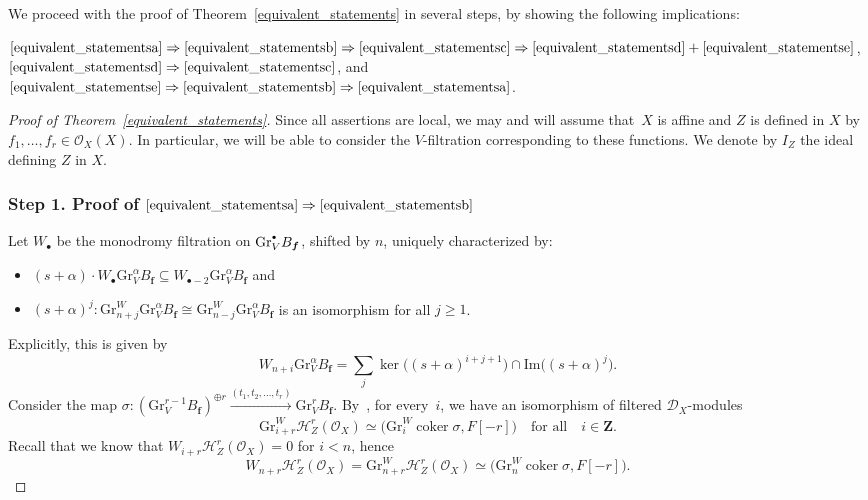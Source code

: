 \documentclass[11pt]{article}
\numberwithin{equation}{section}
\newcommand{\sbullet}{{\scriptscriptstyle\bullet}}
\newcommand{\csbullet}{{\raisebox{1pt}{$\sbullet$}}}
\newcommand{\DXmodules}{$\cD_X$\nobreakdash-mod\-ules\xspace}
\theoremstyle{plain}
\theoremstyle{definition}
\newcommand\Z{{\mathbf Z}}
\newcommand\cD{\mathcal{D}}
\newcommand\cH{\mathcal{H}}
\newcommand\cO{\mathcal{O}}
\newcommand\cH{\mathcal{H}}
\newcommand\cO{\mathcal{O}}
\newcommand\bff{{\boldsymbol f}}
\newcommand\gr{\mathrm{Gr}}
\DeclareMathOperator{\coker}{coker}
\begin{document}
We proceed with the proof of Theorem~\ref{equivalent_statements} in several steps, by showing the following implications:

$\eqref{equivalent_statementsa}\Rightarrow \eqref{equivalent_statementsb} \Rightarrow \eqref{equivalent_statementsc}\Rightarrow \eqref{equivalent_statementsd}+\eqref{equivalent_statementse}$, $\eqref{equivalent_statementsd}\Rightarrow\eqref{equivalent_statementsc}$, and $\eqref{equivalent_statementse}\Rightarrow \eqref{equivalent_statementsb} \Rightarrow \eqref{equivalent_statementsa}$.

\begin{proof}[Proof of Theorem~\ref{equivalent_statements}]
Since all assertions are local, we may and will assume that~$X$ is affine and $Z$ is defined in $X$ by $f_1,\ldots,f_r\in\cO_X(X)$.
In particular, we will be able to consider the $V$-filtration corresponding to these functions. We denote by $I_Z$
the ideal defining $Z$ in $X$.

\subsubsection*{Step 1. Proof of $\eqref{equivalent_statementsa}\Rightarrow\eqref{equivalent_statementsb}$}
Let $W_\sbullet$ be the monodromy filtration on $\gr^\csbullet_V B_\bff$, shifted by $n$, uniquely characterized by:
\begin{itemize}
\item $(s+\alpha)\cdot W_\sbullet\gr_V^{\alpha}B_{\bff} \subseteq W_{\sbullet-2}\gr_V^{\alpha}B_{\bff}$ and
\item $(s+\alpha)^j\colon \gr^W_{n+j}\gr_V^{\alpha}B_{\bff} \cong \gr^W_{n-j}\gr_V^{\alpha}B_{\bff}$ is an isomorphism
for all $j\geq 1$.
\end{itemize}
Explicitly, this is given by
\begin{equation}\label{monodromy}
W_{n+i}\gr_V^{\alpha}B_{\bff}=\sum_j\ker\big((s+\alpha)^{i+j+1}\big)\cap \mathrm{Im}\big((s+\alpha)^{j}\big).
\end{equation}
Consider the map $\sigma\colon \left(\gr^{r-1}_V B_\bff\right)^{\oplus r} \xrightarrow{(t_1,t_2,\dots,t_r)} \gr^{r}_V B_\bff$.
By~\cite[Th.\,1.2]{CD}, for every~$i$, we have an isomorphism of filtered \DXmodules
\begin{equation}\label{eq:sigma}
\gr^W_{i+r}\cH^r_Z(\cO_X)\simeq \big(\gr^W_i\coker \sigma, F[-r]\big)\quad\text{for all}\quad i\in\Z.
\end{equation}
Recall that we know that $W_{i+r}\cH^r_Z(\cO_X)=0$ for $i<n$, hence
\begin{equation}\label{eqW}
W_{n+r}\cH^r_Z(\cO_X)=\gr^W_{n+r}\cH^r_Z(\cO_X)\simeq \big(\gr^W_n\coker \sigma, F[-r]\big).
\end{equation}


\end{proof}
\end{document}
